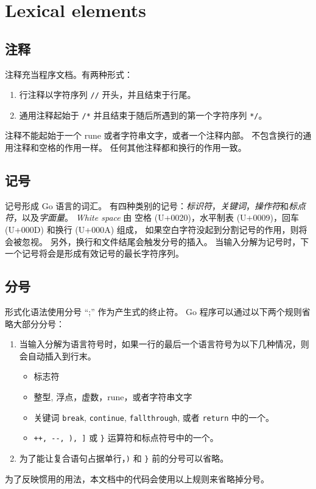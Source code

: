 
\chapter{Lexical elements}

\section{注释}
注释充当程序文档。有两种形式：
\begin{enumerate}
    \item 行注释以字符序列 \verb|//| 开头，并且结束于行尾。
    \item 通用注释起始于 \verb|/*| 并且结束于随后所遇到的第一个字符序列 \verb|*/|。
\end{enumerate}
注释不能起始于一个 rune 或者字符串文字，或者一个注释内部。
不包含换行的通用注释和空格的作用一样。
任何其他注释都和换行的作用一致。

\section{记号}
记号形成 Go 语言的词汇。
有四种类别的记号：\emph{标识符}，\emph{关键词}，\emph{操作符}和\emph{标点符}，以及\emph{字面量}。
\emph{White space} 由 空格 (U+0020)，水平制表 (U+0009)，回车 (U+000D) 和换行 (U+000A) 组成，
如果空白字符没起到分割记号的作用，则将会被忽视。
另外，换行和文件结尾会触发分号的插入。
当输入分解为记号时，下一个记号将会是形成有效记号的最长字符序列。

\section{分号}
形式化语法使用分号 ``;'' 作为产生式的终止符。
Go 程序可以通过以下两个规则省略大部分分号：
\begin{enumerate}
\item 当输入分解为语言符号时，如果一行的最后一个语言符号为以下几种情况，则会自动插入到行末。
	\begin{itemize}
		\item 标志符
		\item 整型, 浮点，虚数，rune，或者字符串文字
		\item 关键词 \verb|break|, \verb|continue|, \verb|fallthrough|, 或者 \verb|return| 中的一个。
		\item \verb|++, --, ), ]| 或 \verb|}| 运算符和标点符号中的一个。
	\end{itemize}
\item 为了能让复合语句占据单行，\verb|)| 和 \verb|}| 前的分号可以省略。 
\end{enumerate}
为了反映惯用的用法，本文档中的代码会使用以上规则来省略掉分号。


